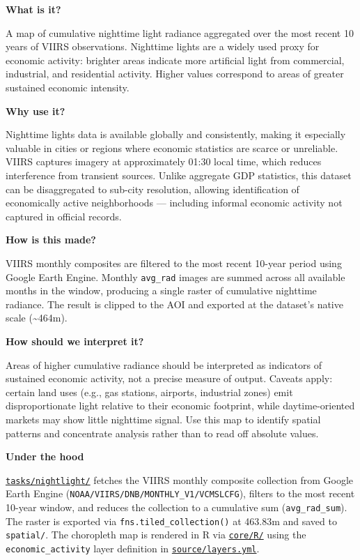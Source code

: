 \documentclass[
  letterpaper,
  DIV=11,
  numbers=noendperiod]{scrreprt}
\begin{document}
\textbf{What is it?}

A map of cumulative nighttime light radiance aggregated over the most
recent 10 years of VIIRS observations. Nighttime lights are a widely
used proxy for economic activity: brighter areas indicate more
artificial light from commercial, industrial, and residential activity.
Higher values correspond to areas of greater sustained economic
intensity.

\textbf{Why use it?}

Nighttime lights data is available globally and consistently, making it
especially valuable in cities or regions where economic statistics are
scarce or unreliable. VIIRS captures imagery at approximately 01:30
local time, which reduces interference from transient sources. Unlike
aggregate GDP statistics, this dataset can be disaggregated to sub-city
resolution, allowing identification of economically active neighborhoods
--- including informal economic activity not captured in official
records.

\textbf{How is this made?}

VIIRS monthly composites are filtered to the most recent 10-year period
using Google Earth Engine. Monthly \texttt{avg\_rad} images are summed
across all available months in the window, producing a single raster of
cumulative nighttime radiance. The result is clipped to the AOI and
exported at the dataset's native scale (\textasciitilde464m).

\textbf{How should we interpret it?}

Areas of higher cumulative radiance should be interpreted as indicators
of sustained economic activity, not a precise measure of output. Caveats
apply: certain land uses (e.g., gas stations, airports, industrial
zones) emit disproportionate light relative to their economic footprint,
while daytime-oriented markets may show little nighttime signal. Use
this map to identify spatial patterns and concentrate analysis rather
than to read off absolute values.

\textbf{Under the hood}

\href{../tasks/nightlight/}{\texttt{tasks/nightlight/}} fetches the
VIIRS monthly composite collection from Google Earth Engine
(\texttt{NOAA/VIIRS/DNB/MONTHLY\_V1/VCMSLCFG}), filters to the most
recent 10-year window, and reduces the collection to a cumulative sum
(\texttt{avg\_rad\_sum}). The raster is exported via
\texttt{fns.tiled\_collection()} at 463.83m and saved to
\texttt{spatial/}. The choropleth map is rendered in R via
\href{../core/R/}{\texttt{core/R/}} using the
\texttt{economic\_activity} layer definition in
\href{../source/layers.yml}{\texttt{source/layers.yml}}.
\end{document}
